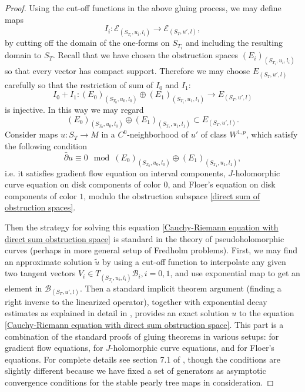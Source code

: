 \documentclass{amsart}
\numberwithin{equation}{section}
\numberwithin{figure}{section}
\begin{document}
\begin{proof}
	Using the cut-off functions in the above gluing process, we may define maps
\begin{equation}
I_{i}: \mathcal{E}_{(S_{T_{i}}, u_{i}, l_{i})} \to \mathcal{E}_{(S_{T}, u', l)},
\end{equation}
by cutting off the domain of the one-forms on $S_{T_{i}}$ and including the resulting domain to $S_{T}$. Recall that we have chosen the obstruction spaces $(E_{i})_{(S_{T_{i}}, u_{i}, l_{i})}$ so that every vector has compact support. Therefore we may choose $E_{(S_{T}, u', l)}$ carefully so that the restriction of sum of $I_{0}$ and $I_{1}$:
\begin{equation}
I_{0} + I_{1}: (E_{0})_{(S_{T_{0}}, u_{0}, l_{0})} \oplus (E_{1})_{(S_{T_{1}}, u_{1}, l_{1})} \to E_{(S_{T}, u', l)}
\end{equation}
is injective. In this way we may regard
\begin{equation}\label{direct sum of obstruction spaces}
(E_{0})_{(S_{T_{0}}, u_{0}, l_{0})} \oplus (E_{1})_{(S_{T_{1}}, u_{1}, l_{1})} \subset E_{(S_{T}, u', l)}.
\end{equation}
Consider maps $u: S_{T} \to M$ in a $C^{0}$-neighborhood of $u'$ of class $W^{1, p}$, which satisfy the following condition
\begin{equation}\label{Cauchy-Riemann equation with direct sum obstruction space}
\bar{\partial}u \equiv 0 \mod (E_{0})_{(S_{T_{0}}, u_{0}, l_{0})} \oplus (E_{1})_{(S_{T_{1}}, u_{1}, l_{1})},
\end{equation}
i.e. it satisfies gradient flow equation on interval components, $J$-holomorphic curve equation on disk components of color $0$, and Floer's equation on disk components of color $1$, modulo the obstruction subspace \eqref{direct sum of obstruction spaces}. \par
	Then the strategy for solving this equation \eqref{Cauchy-Riemann equation with direct sum obstruction space} is standard in the theory of pseudoholomorphic curves (perhaps in more general setup of Fredholm problems). First, we may find an approximate solution $\tilde{u}$ by using a cut-off function to interpolate any given two tangent vectors $V_{i} \in T_{(S_{T_{i}}, u_{i}, l_{i})}\mathcal{B}_{i}, i = 0, 1$, and use exponential map to get an element in $\mathcal{B}_{(S_{T}, u', l)}$. Then a standard implicit theorem argument (finding a right inverse to the linearized operator), together with exponential decay estimates as explained in detail in \cite{FOOO2}, \cite{FOOO3} provides an exact solution $u$ to the equation \eqref{Cauchy-Riemann equation with direct sum obstruction space}. This part is a combination of the standard proofs of gluing theorems in various setups: for gradient flow equations, for $J$-holomorphic curve equations, and for Floer's equations. For complete details see section 7.1 of \cite{FOOO2}, though the conditions are slightly different because we have fixed a set of generators as asymptotic convergence conditions for the stable pearly tree maps in consideration. \par

\end{proof}
\end{document}
